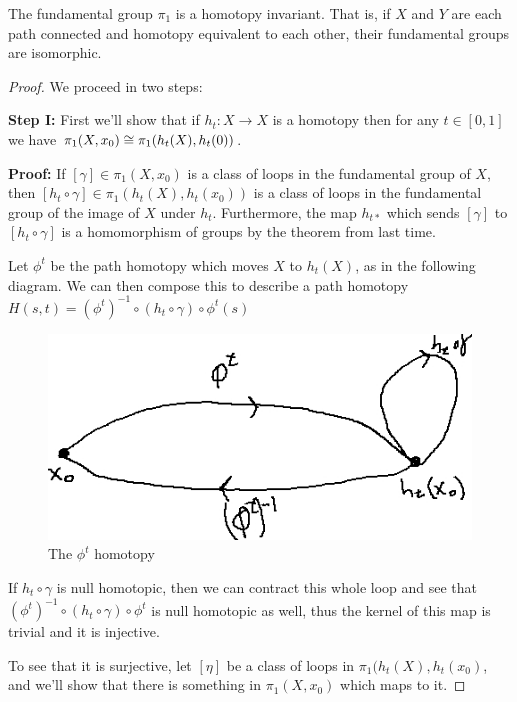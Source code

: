\begin{theorem}
	The fundamental group $\pi_1$ is a homotopy invariant.  That is, if $X$ and $Y$ are each path connected and homotopy equivalent to each other, their fundamental groups are isomorphic.
\end{theorem}
\begin{proof}
	We proceed in two steps:
	
	\textbf{Step I:} First we'll show that if $h_t:X\rightarrow X$ is a homotopy then for any $t\in[0,1]$ we have $\pi_1(X,x_0)\cong \pi_1(h_t(X),h_t(0))$.
	
	\textbf{Proof:} If $[\gamma]\in\pi_1(X,x_0)$ is a class of loops in the fundamental group of $X$, then $[h_t\circ\gamma]\in \pi_1(h_t(X),h_t(x_0))$ is a class of loops in the fundamental group of the image of $X$ under $h_t$.  Furthermore, the map $h_{t*}$ which sends $[\gamma]$ to $[h_t\circ\gamma ]$ is a homomorphism of groups by the theorem from last time.  
	
	Let $\phi^t$ be the path homotopy which moves $X$ to $h_t(X)$, as in the following diagram.  We can then compose this to describe  a path homotopy $H(s,t) = (\phi^{t})^{-1}\circ (h_t\circ \gamma)\circ \phi^t (s)$\\
	
	\begin{figure}[!htb]
		\centering
		\includegraphics[scale=.5]{images/hst_hom}
		\caption{The $\phi^t$ homotopy}
		\label{fig:hst_hom}
	\end{figure}
	
If $h_t\circ\gamma$ is null homotopic, then we can contract this whole loop and see that $(\phi^{t})^{-1}\circ (h_t\circ \gamma)\circ \phi^t$ is null homotopic as well, thus the kernel of this map is trivial and it is injective.

To see that it is surjective, let $[\eta]$ be a class of loops in $\pi_1(h_t(X),h_t(x_0)$, and we'll show that there is something in $\pi_1(X,x_0)$ which maps to it.


\end{proof}
